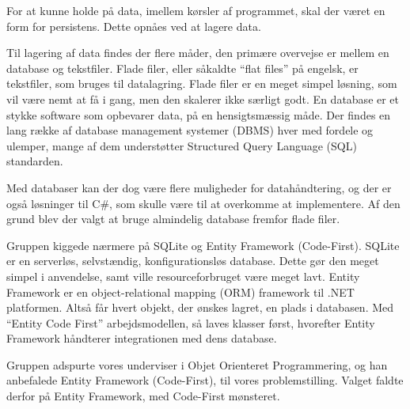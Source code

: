 For at kunne holde på data, imellem kørsler af programmet, skal der været en form for persistens. 
Dette opnåes ved at lagere data. 

Til lagering af data findes der flere måder, den primære overvejse er mellem en database og tekstfiler.
Flade filer, eller såkaldte ``flat files'' på engelsk, er tekstfiler, som bruges til datalagring. 
Flade filer er en meget simpel løsning, som vil være nemt at få i gang, men den skalerer ikke særligt godt. 
En database er et stykke software som opbevarer data, på en hensigtsmæssig måde. 
Der findes en lang række af database management systemer (DBMS) hver med fordele og ulemper, mange af dem understøtter Structured Query Language (SQL) standarden.

Med databaser kan der dog være flere muligheder for datahåndtering, og der er også løsninger til C\#, som skulle være til at overkomme at implementere.\citep{flatfiles} 
Af den grund blev der valgt at bruge almindelig database fremfor flade filer. 

Gruppen kiggede nærmere på SQLite og Entity Framework (Code-First). 
SQLite er en serverløs, selvstændig, konfigurationsløs database. 
Dette gør den meget simpel i anvendelse, samt ville resourceforbruget være meget lavt. 
Entity Framework er en object-relational mapping (ORM) framework til .NET platformen. 
Altså får hvert objekt, der ønskes lagret, en plads i databasen. 
Med ``Entity Code First'' arbejdsmodellen, så laves klasser først, hvorefter Entity Framework håndterer integrationen med dens database.

Gruppen adspurte vores underviser i Objet Orienteret Programmering, og han anbefalede Entity Framework (Code-First), til vores problemstilling. 
Valget faldte derfor på Entity Framework, med Code-First mønsteret. 

